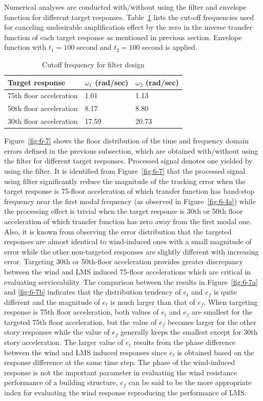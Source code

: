 Numerical analyses are conducted with/without using the filter and envelope function for different target responses. Table~\ref{tab:6-1} lists the cut-off frequencies used for canceling undesirable amplification effect by the zero in the inverse transfer function of each target response as mentioned in previous section. Envelope function with $t_{1}=100$ second and $t_{2}=100$ second is applied.

\begin{table}[ht]
\centering
\begin{tabularx}{\textwidth}{@{}X|X|X@{}}
\toprule[1pt]\midrule[0.3pt]
Target response & $\omega_{1}$ (rad/sec) & $\omega_{2}$ (rad/sec)\\ \hline
75th floor acceleration & 1.01 & 1.13\\
50th floor acceleration & 8.17 & 8.80\\
30th floor acceleration & 17.59 & 20.73\\
\bottomrule
\end{tabularx}
\caption{Cutoff frequency for filter design}
\label{tab:6-1}
\end{table}

Figure~\ref{fig:6-7} shows the floor distribution of the time and frequency domain errors defined in the previous subsection, which are obtained with/without using the filter for different target responses. Processed signal denotes one yielded by using the filter. It is identified from Figure~\ref{fig:6-7} that the processed signal using filter significantly reduce the magnitude of the tracking error when the target response is 75-floor acceleration of which transfer function has band-stop frequency near the first modal frequency (as observed in Figure~\ref{fig:6-4a}) while the processing effect is trivial when the target response is 30th or 50th floor acceleration of which transfer function has zero away from the first modal one. Also, it is known from observing the error distribution that the targeted responses are almost identical to wind-induced ones with a small magnitude of error while the other non-targeted responses are slightly different with increasing error. Targeting 30th or 50th-floor acceleration provides greater discrepancy between the wind and LMS induced 75-floor accelerations which are critical in evaluating serviceability.
The comparison between the results in Figure~\ref{fig:6-7a} and \ref{fig:6-7b} indicates that the distribution tendency of $e_{t}$ and $e_{f}$ is quite different and the magnitude of $e_{t}$ is much larger than that of $e_{f}$. When targeting response is 75th floor acceleration, both values of $e_{t}$ and $e_{f}$ are smallest for the targeted 75th floor acceleration, but the value of $e_{f}$ becomes larger for the other story responses while the value of $e_{f}$ generally keeps the smallest except for 30th story acceleration. The larger value of $e_{t}$ results from the phase difference between the wind and LMS induced responses since $e_{t}$ is obtained based on the response difference at the same time step. The phase of the wind-induced response is not the important parameter in evaluating the wind resistance performance of a building structure, $e_{f}$ can be said to be the more appropriate index for evaluating the wind response reproducing the performance of LMS.

